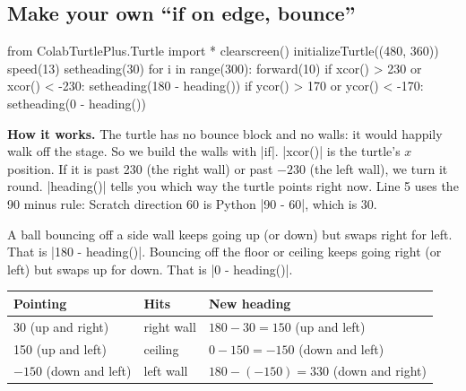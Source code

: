 \subsection*{Make your own ``if on edge, bounce''}

\begin{tcbraster}[raster columns=2, raster equal height=rows, raster column skip=12pt, raster valign=center, raster force size=false, raster column 1/.style={width=0.28\linewidth}, raster column 2/.style={width=0.72\linewidth-12pt}]
\begin{tcolorbox}[colback=white, colframe=white, boxrule=0pt, valign=center, left=0pt, right=0pt]
\begin{scratch}
\end{scratch}
\end{tcolorbox}
\begin{code}
from ColabTurtlePlus.Turtle import *
clearscreen()
initializeTurtle((480, 360))
speed(13)
setheading(30)
for i in range(300):
    forward(10)
    if xcor() > 230 or xcor() < -230:
        setheading(180 - heading())
    if ycor() > 170 or ycor() < -170:
        setheading(0 - heading())
\end{code}
\end{tcbraster}

\textbf{How it works.} The turtle has no bounce block and no walls: it would happily walk off the stage. So we build the walls with \py|if|. \py|xcor()| is the turtle's $x$ position. If it is past 230 (the right wall) or past $-230$ (the left wall), we turn it round. \py|heading()| tells you which way the turtle points right now. Line 5 uses the 90 minus rule: Scratch direction 60 is Python \py|90 - 60|, which is 30.

\begin{think}
A ball bouncing off a side wall keeps going up (or down) but swaps right for left. That is \py|180 - heading()|. Bouncing off the floor or ceiling keeps going right (or left) but swaps up for down. That is \py|0 - heading()|.
\begin{center}
\renewcommand{\arraystretch}{1.25}
\begin{tabular}{lll}
\toprule
\textbf{Pointing} & \textbf{Hits} & \textbf{New heading} \\
\midrule
30 (up and right) & right wall & $180 - 30 = 150$ (up and left) \\
150 (up and left) & ceiling & $0 - 150 = -150$ (down and left) \\
$-150$ (down and left) & left wall & $180 - (-150) = 330$ (down and right) \\
\bottomrule
\end{tabular}
\end{center}
\end{think}

